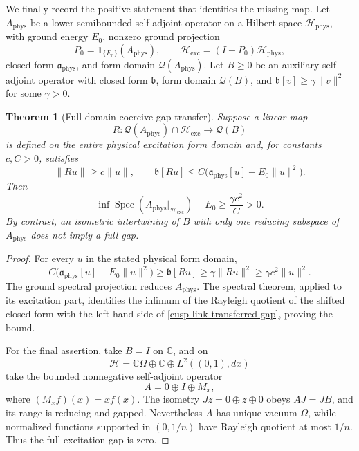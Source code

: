 \documentclass[11pt]{article}
\newtheorem{theorem}{Theorem}[section]
\theoremstyle{definition}
\numberwithin{equation}{section}
\begin{document}
We finally record the positive statement that identifies the missing map.
Let \(A_{\mathrm{phys}}\) be a lower-semibounded self-adjoint operator on a
Hilbert space \(\mathcal H_{\mathrm{phys}}\), with ground energy \(E_0\),
nonzero ground projection
\[
 P_0=\mathbf1_{\{E_0\}}(A_{\mathrm{phys}}),
 \qquad
 \mathcal H_{\mathrm{exc}}=(I-P_0)\mathcal H_{\mathrm{phys}},
\]
closed form \(\mathfrak a_{\mathrm{phys}}\), and form domain
\(\mathcal Q(A_{\mathrm{phys}})\).  Let \(B\ge0\) be an auxiliary
self-adjoint operator with closed form \(\mathfrak b\), form domain
\(\mathcal Q(B)\), and \(\mathfrak b[v]\ge\gamma\|v\|^2\) for some
\(\gamma>0\).

\begin{theorem}[Full-domain coercive gap transfer]
\label{cusp-link-full-domain-gap-transfer}
Suppose a linear map
\[
 R:\mathcal Q(A_{\mathrm{phys}})\cap\mathcal H_{\mathrm{exc}}
   \longrightarrow\mathcal Q(B)
\]
is defined on the entire physical excitation form domain and, for constants
\(c,C>0\), satisfies
\begin{equation}
 \|Ru\|\ge c\|u\|,
 \qquad
 \mathfrak b[Ru]\le
 C\bigl(\mathfrak a_{\mathrm{phys}}[u]-E_0\|u\|^2\bigr).
 \label{cusp-link-full-domain-comparison}
\end{equation}
Then
\begin{equation}
 \inf\operatorname{Spec}
 \left(A_{\mathrm{phys}}|_{\mathcal H_{\mathrm{exc}}}\right)-E_0
 \ge\frac{\gamma c^2}{C}>0.
 \label{cusp-link-transferred-gap}
\end{equation}
By contrast, an isometric intertwining of \(B\) with only one reducing
subspace of \(A_{\mathrm{phys}}\) does not imply a full gap.
\end{theorem}

\begin{proof}
For every \(u\) in the stated physical form domain,
\[
 C\bigl(\mathfrak a_{\mathrm{phys}}[u]-E_0\|u\|^2\bigr)
 \ge\mathfrak b[Ru]
 \ge\gamma\|Ru\|^2
 \ge\gamma c^2\|u\|^2.
\]
The ground spectral projection reduces \(A_{\mathrm{phys}}\).  The spectral
theorem, applied to its excitation part, identifies the infimum of the
Rayleigh quotient of the shifted closed form with the left-hand side of
\eqref{cusp-link-transferred-gap}, proving the bound.

For the final assertion, take \(B=I\) on \(\mathbb C\), and on
\[
 \mathcal H=\mathbb C\Omega\oplus\mathbb C\oplus L^2((0,1),dx)
\]
take the bounded nonnegative self-adjoint operator
\[
 A=0\oplus I\oplus M_x,
\]
where \((M_xf)(x)=xf(x)\).  The isometry
\(Jz=0\oplus z\oplus0\) obeys \(AJ=JB\), and its range is reducing and
gapped.  Nevertheless \(A\) has unique vacuum \(\Omega\), while normalized
functions supported in \((0,1/n)\) have Rayleigh quotient at most \(1/n\).
Thus the full excitation gap is zero.
\end{proof}
\end{document}
